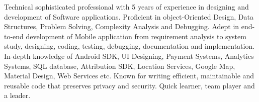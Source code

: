 %
%
%
\par{
Technical sophisticated professional with 5 years of experience in designing and development of Software applications. Proficient in object-Oriented Design, Data Structures, Problem Solving, Complexity Analysis and Debugging. Adept in end-to-end development of Mobile application from requirement analysis to system study, designing, coding, testing, debugging, documentation and implementation. In-depth knowledge of Android SDK, UI Designing, Payment Systems, Analytics Systems, SQL database, Attribution SDK, Location Services, Google Map, Material Design, Web Services etc. Known for writing efficient, maintainable and reusable code that preserves privacy and security. Quick learner, team player and a leader. 
}